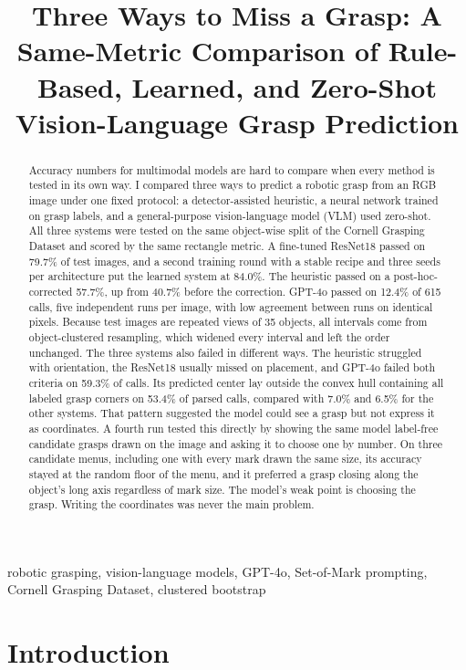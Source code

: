 \documentclass[10pt,conference,compsoc]{IEEEtran}
\title{Three Ways to Miss a Grasp: A Same-Metric Comparison of Rule-Based, Learned, and Zero-Shot Vision-Language Grasp Prediction}
\author{\IEEEauthorblockN{Anish Talla}
\IEEEauthorblockA{\textit{High School Student}\\
Lightridge High School and Academies of Loudoun\\
Virginia, United States\\
anish.talla99@gmail.com\\
\textit{Preprint, September 2026. Code and data:} \url{https://github.com/anishtalla27/Vision-Based-Grasping}}}
\begin{document}
\maketitle

\begin{abstract}
Accuracy numbers for multimodal models are hard to compare when every
method is tested in its own way. I compared three ways to predict a robotic grasp from an
RGB image under one fixed protocol: a detector-assisted heuristic, a
neural network trained on grasp labels, and a general-purpose
vision-language model (VLM) used zero-shot. All three systems
were tested on the same object-wise split of the Cornell Grasping Dataset and
scored by the same rectangle metric. A fine-tuned ResNet18 passed on 79.7\%
of test images, and a second training round with a stable recipe and three
seeds per architecture put the learned system at 84.0\%. The heuristic
passed on a post-hoc-corrected 57.7\%, up from 40.7\% before the
correction. GPT-4o passed on 12.4\% of 615 calls, five independent runs per image,
with low agreement between runs on identical pixels. Because test images
are repeated views of 35 objects, all intervals come from object-clustered
resampling, which widened every interval and left the order unchanged. The three systems also failed in different ways. The heuristic struggled with
orientation, the ResNet18 usually missed on placement, and GPT-4o failed
both criteria on 59.3\% of calls. Its predicted
center lay outside the convex hull containing all labeled grasp corners on 53.4\%
of parsed calls, compared with 7.0\% and 6.5\% for the other systems. That
pattern suggested the model could see a grasp but not express it as
coordinates. A fourth run tested this directly by showing the same model
label-free candidate grasps drawn on the image and asking it to choose one
by number. On three candidate menus, including one with every mark drawn
the same size, its accuracy stayed at the random floor of the menu, and it
preferred a grasp closing along the object's long axis regardless of mark
size. The model's weak point is choosing the grasp. Writing the
coordinates was never the main problem.
\end{abstract}

\begin{IEEEkeywords}
robotic grasping, vision-language models, GPT-4o, Set-of-Mark prompting,
Cornell Grasping Dataset, clustered bootstrap
\end{IEEEkeywords}

\section{Introduction}
\end{document}

